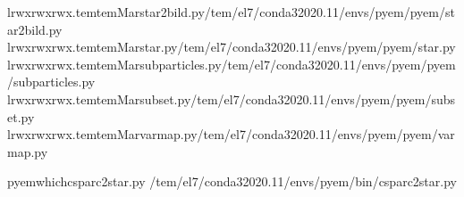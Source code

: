 \documentclass[a4paper,11pt,english]{sphinxmanual}
\begin{document}
\begin{sphinxVerbatim}[commandchars=\\\{\}]
lrwxrwxrwx.temtemMarstar2bild.py\PYGZhy{}\PYGZgt{}/tem/el7/conda3\PYGZhy{}2020.11/envs/pyem/pyem/star2bild.py
lrwxrwxrwx.temtemMarstar.py\PYGZhy{}\PYGZgt{}/tem/el7/conda3\PYGZhy{}2020.11/envs/pyem/pyem/star.py
lrwxrwxrwx.temtemMarsubparticles.py\PYGZhy{}\PYGZgt{}/tem/el7/conda3\PYGZhy{}2020.11/envs/pyem/pyem/subparticles.py
lrwxrwxrwx.temtemMarsubset.py\PYGZhy{}\PYGZgt{}/tem/el7/conda3\PYGZhy{}2020.11/envs/pyem/pyem/subset.py
lrwxrwxrwx.temtemMarvarmap.py\PYGZhy{}\PYGZgt{}/tem/el7/conda3\PYGZhy{}2020.11/envs/pyem/pyem/varmap.py
\end{sphinxVerbatim}

\begin{sphinxVerbatim}[commandchars=\\\{\}]
pyem\PYGZdl{}\PYGZgt{}whichcsparc2star.py
/tem/el7/conda3\PYGZhy{}2020.11/envs/pyem/bin/csparc2star.py
\end{sphinxVerbatim}
\end{document}

